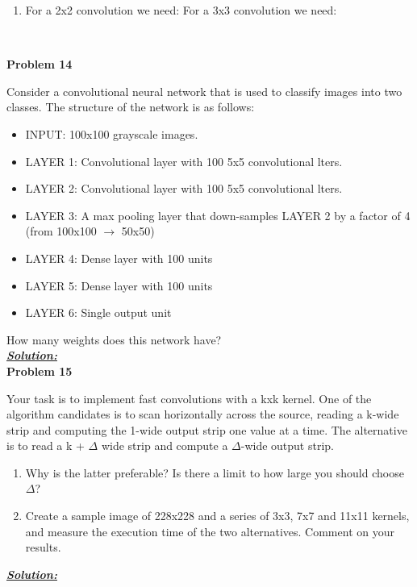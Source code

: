 \documentclass{article}
\begin{document}
\begin{enumerate} [label=\Alph*]
          Now we need to add the initial matrix to the result of the ReLU matrix and we get the max pooled matrix: \\

          $max = \begin{bmatrix}
              5 & 8 & 18 & 20 \\
              7 & 6 & 18 & 20 \\
              7 & 3 & 11 & 17
          \end{bmatrix}$

          \item 

          For a 2x2 convolution we need:
          For a 3x3 convolution we need:

          

          
\end{enumerate}\

\newpage
\noindent \textbf{Problem 14}

\noindent Consider a convolutional neural network that is used to classify images into two classes.
The structure of the network is as follows:

\begin{itemize}
    \item INPUT: 100x100 grayscale images.
    \item LAYER 1: Convolutional layer with 100 5x5 convolutional lters.
    \item LAYER 2: Convolutional layer with 100 5x5 convolutional lters.
    \item LAYER 3: A max pooling layer that down-samples LAYER 2 by a factor of 4 (from 100x100 $\rightarrow$ 50x50)
    \item LAYER 4: Dense layer with 100 units
    \item LAYER 5: Dense layer with 100 units
    \item LAYER 6: Single output unit
\end{itemize}

\noindent How many weights does this network have? \\

\noindent \underline{\textbf{\textit{Solution:}}} \\ 

\newpage
\noindent \textbf{Problem 15}

Your task is to implement fast convolutions with a kxk kernel. One of the algorithm
candidates is to scan horizontally across the source, reading a k-wide strip and computing
the 1-wide output strip one value at a time. The alternative is to read a k + $\Delta$ wide strip
and compute a $\Delta$-wide output strip.
\begin{enumerate} [label=\Alph*]
    \item Why is the latter preferable? Is there a limit to how large you should choose $\Delta$?
    \item Create a sample image of 228x228 and a series of 3x3, 7x7 and 11x11 kernels, and
measure the execution time of the two alternatives. Comment on your results.

\end{enumerate}

\noindent \underline{\textbf{\textit{Solution:}}} \\ 
\end{document}
